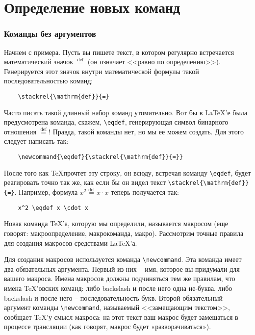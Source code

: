 \part{Определение новых команд}
\section{Команды без аргументов}

Начнем с примера. Пусть вы пишете текст, в котором регулярно встречается математический значок $\stackrel{\mathrm{def}}{=}$ (он означает <<равно по определению>>). Генерируется этот значок внутри математической формулы такой последовательностью команд:

\begin{verbatim}
	\stackrel{\mathrm{def}}{=}
\end{verbatim}

Часто писать такой длинный набор команд утомительно. Вот бы в \LaTeX’е была предусмотрена команда, скажем, \verb"\eqdef", генерирующая символ бинарного отношения $\stackrel{\mathrm{def}}{=}$! Правда, такой команды нет, но мы ее можем создать. Для этого следует написать так:

\begin{verbatim}
	\newcommand{\eqdef}{\stackrel{\mathrm{def}}{=}}
\end{verbatim}

\newcommand{\eqdef}{\stackrel{\mathrm{def}}{=}}

После того как \TeX прочтет эту строку, он всюду, встречая команду \verb"\eqdef", будет реагировать точно так же, как если бы он видел текст \verb"\stackrel{\mathrm{def}}{=}". Например, формула $x^2 \eqdef x \cdot x$ теперь получается так:

\begin{verbatim}
	x^2 \eqdef x \cdot x
\end{verbatim}

Новая команда \TeX’а, которую мы определили, называется макросом (еще говорят: макроопределение, макрокоманда, макро). Рассмотрим точные правила для создания макросов средствами \LaTeX’а.

Для создания макросов используется команда \verb"\newcommand". Эта команда имеет два обязательных аргумента. Первый из них -- имя, которое вы придумали для вашего макроса. Имена макросов должны подчиняться тем же правилам, что имена \TeX’овских команд: либо backslash и после него одна не-буква, либо backslash и после него -- последовательность букв. Второй обязательный аргумент команды \verb"\newcommand", называемый <<замещающим текстом>>, сообщает \TeX’у смысл макроса: на этот текст ваш макрос будет замещаться в процессе трансляции (как говорят, макрос будет «разворачиваться»).

